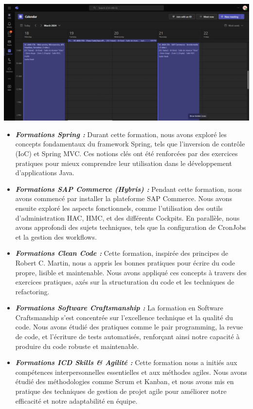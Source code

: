 \begin{center}
    \centering
    \includegraphics[width=19cm]{Figures/formation.png}
    \label{fig:structure_payment}
\end{center}
\begin{itemize}
    \item \textbf{\textit{Formations Spring :}}
    Durant cette formation, nous avons exploré les concepts fondamentaux du framework Spring, tels que l'inversion de contrôle (IoC) et Spring MVC. Ces notions clés ont été renforcées par des exercices pratiques pour mieux comprendre leur utilisation dans le développement d'applications Java.
    \item \textbf{\textit{Formations SAP Commerce (Hybris) :}}
    Pendant cette formation, nous avons commencé par installer la plateforme SAP Commerce. Nous avons ensuite exploré les aspects fonctionnels, comme l'utilisation des outils d'administration HAC, HMC, et des différents Cockpits. En parallèle, nous avons approfondi des sujets techniques, tels que la configuration de CronJobs et la gestion des workflows.
    \item  \textbf{\textit{Formations Clean Code :}}
    Cette formation, inspirée des principes de Robert C. Martin, nous a appris les bonnes pratiques pour écrire du code propre, lisible et maintenable. Nous avons appliqué ces concepts à travers des exercices pratiques, axés sur la structuration du code et les techniques de refactoring.
    \item \textbf{\textit{ Formations Software Craftsmanship :}}
    La formation en Software Craftsmanship s'est concentrée sur l'excellence technique et la qualité du code. Nous avons étudié des pratiques comme le pair programming, la revue de code, et l'écriture de tests automatisés, renforçant ainsi notre capacité à produire du code robuste et maintenable.
    \item \textbf{\textit{Formations ICD Skills \& Agilité :}}
    Cette formation nous a initiés aux compétences interpersonnelles essentielles et aux méthodes agiles. Nous avons étudié des méthodologies comme Scrum et Kanban, et nous avons mis en pratique des techniques de gestion de projet agile pour améliorer notre efficacité et notre adaptabilité en équipe.
\end{itemize}
